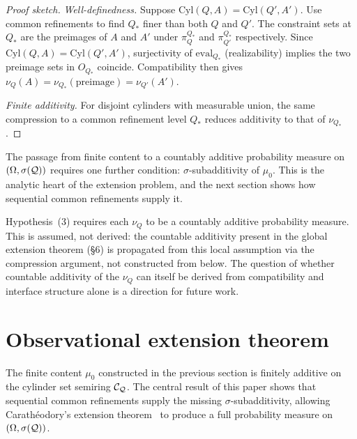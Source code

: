 \begin{proof}[Proof sketch]
\textit{Well-definedness.}
Suppose $\mathrm{Cyl}(Q,A)=\mathrm{Cyl}(Q',A')$.  Use common refinements
to find $Q_*$ finer than both $Q$ and $Q'$.  The constraint sets
at $Q_*$ are the preimages of $A$ and $A'$ under $\pi^{Q_*}_Q$ and
$\pi^{Q_*}_{Q'}$ respectively.  Since $\mathrm{Cyl}(Q,A)=\mathrm{Cyl}(Q',A')$,
surjectivity of $\mathrm{eval}_{Q_*}$ (realizability) implies the two
preimage sets in $O_{Q_*}$ coincide.  Compatibility then gives
$\nu_Q(A)=\nu_{Q_*}(\text{preimage})=\nu_{Q'}(A')$.

\textit{Finite additivity.}
For disjoint cylinders with measurable union, the same compression to
a common refinement level $Q_*$ reduces additivity to that of $\nu_{Q_*}$.
\end{proof}

\begin{remark}
The passage from finite content to a countably additive
probability measure on $(\Omega,\sigma(\mathcal{Q}))$ requires one further
condition: $\sigma$-subadditivity of $\mu_0$.  This is the analytic
heart of the extension problem, and the next section shows how
sequential common refinements supply it.

Hypothesis~(3) requires each $\nu_Q$ to be a countably additive
probability measure. This is assumed, not derived: the countable
additivity present in the global extension theorem (\S6) is propagated
from this local assumption via the compression argument, not
constructed from below. The question of whether countable additivity
of the $\nu_Q$ can itself be derived from compatibility and interface
structure alone is a direction for future work.
\end{remark}

\section{Observational extension theorem}

The finite content $\mu_0$ constructed in the previous section is
finitely additive on the cylinder set semiring $\mathcal{C}_{\mathcal{Q}}$.
The central result of this paper shows that sequential common refinements
supply the missing $\sigma$-subadditivity, allowing Carathéodory's
extension theorem~\cite{Billingsley,Bogachev} to produce a full probability
measure on $(\Omega,\sigma(\mathcal{Q}))$.

